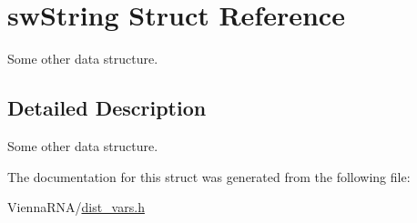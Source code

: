 \hypertarget{structswString}{}\section{sw\+String Struct Reference}
\label{structswString}


Some other data structure.  




\subsection{Detailed Description}
Some other data structure. 

The documentation for this struct was generated from the following file\+:\begin{DoxyCompactItemize}
\item 
Vienna\+R\+N\+A/\mbox{\hyperlink{dist__vars_8h}{dist\+\_\+vars.\+h}}\end{DoxyCompactItemize}
